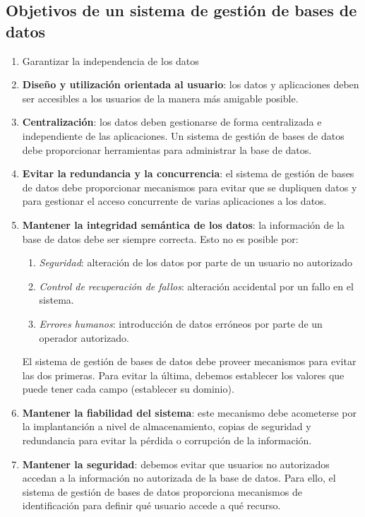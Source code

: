 \documentclass[10pt,a4paper,spanish]{report}
\begin{document}
\textcolor[rgb]{1,0.2,0.3}{\section{Objetivos de un sistema de gestión de bases de datos}}
\begin{enumerate}[$\heartsuit$]
    \item Garantizar la independencia de los datos
    \item \textcolor[rgb]{1,0.2,0.3}{\textbf{Diseño y utilización orientada al usuario}}: los datos y aplicaciones deben ser accesibles a los usuarios de la manera más amigable posible.
    \item \textcolor[rgb]{1,0.2,0.3}{\textbf{Centralización}}: los datos deben gestionarse de forma centralizada e independiente de las aplicaciones. Un sistema de gestión de bases de datos debe proporcionar herramientas para administrar la base de datos.
    \item \textcolor[rgb]{1,0.2,0.3}{\textbf{Evitar la redundancia y la concurrencia}}: el sistema de gestión de bases de datos debe proporcionar mecanismos para evitar que se dupliquen datos y para gestionar el acceso concurrente de varias aplicaciones a los datos.
    \item \textcolor[rgb]{1,0.2,0.3}{\textbf{Mantener la integridad semántica de los datos}}: la información de la base de datos debe ser siempre correcta. Esto no es posible por:
    \begin{enumerate}[$\longrightarrow$]
        \item \textit{\textcolor[rgb]{1,0.2,0.3}{Seguridad}}: alteración de los datos por parte de un usuario no autorizado
        \item \textcolor[rgb]{1,0.2,0.3}{\textit{Control de recuperación de fallos}}: alteración accidental por un fallo en el sistema.
        \item \textcolor[rgb]{1,0.2,0.3}{\textit{Errores humanos}}: introducción de datos erróneos por parte de un operador autorizado.
    \end{enumerate}
    El sistema de gestión de bases de datos debe proveer mecanismos para evitar las dos primeras. Para evitar la última, debemos establecer los valores que puede tener cada campo (establecer su dominio).
    \item \textcolor[rgb]{1,0.2,0.3}{\textbf{Mantener la fiabilidad del sistema}}: este mecanismo debe acometerse por la implantanción a nivel de almacenamiento, copias de seguridad y redundancia para evitar la pérdida o corrupción de la información.
    \item \textcolor[rgb]{1,0.2,0.3}{\textbf{Mantener la seguridad}}: debemos evitar que usuarios no autorizados accedan a la información no autorizada de la base de datos. Para ello, el sistema de gestión de bases de datos proporciona mecanismos de identificación para definir qué usuario accede a qué recurso.
\end{enumerate}
\end{document}
